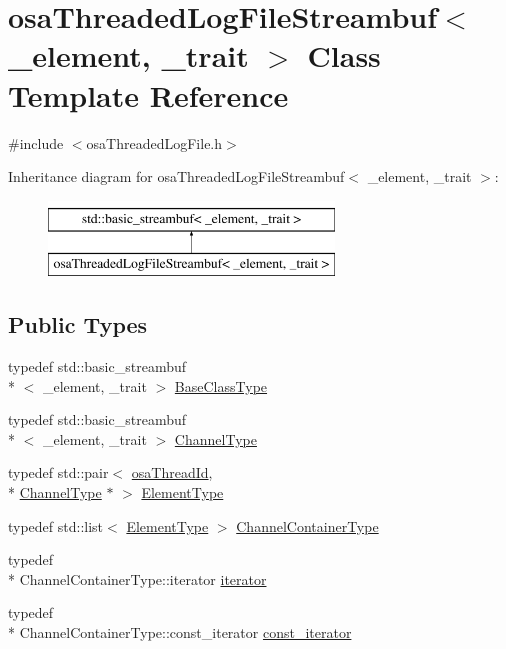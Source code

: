 \hypertarget{classosa_threaded_log_file_streambuf}{\section{osa\-Threaded\-Log\-File\-Streambuf$<$ \-\_\-element, \-\_\-trait $>$ Class Template Reference}
\label{classosa_threaded_log_file_streambuf}
}


{\ttfamily \#include $<$osa\-Threaded\-Log\-File.\-h$>$}

Inheritance diagram for osa\-Threaded\-Log\-File\-Streambuf$<$ \-\_\-element, \-\_\-trait $>$\-:\begin{figure}[H]
\begin{center}
\leavevmode
\includegraphics[height=2.000000cm]{dc/d13/classosa_threaded_log_file_streambuf}
\end{center}
\end{figure}
\subsection*{Public Types}
\begin{DoxyCompactItemize}
\item 
typedef std\-::basic\-\_\-streambuf\\*
$<$ \-\_\-element, \-\_\-trait $>$ \hyperlink{classosa_threaded_log_file_streambuf_a918db063483813434ed1d8f81c3fb205}{Base\-Class\-Type}
\item 
typedef std\-::basic\-\_\-streambuf\\*
$<$ \-\_\-element, \-\_\-trait $>$ \hyperlink{classosa_threaded_log_file_streambuf_a216ca33908152519430e5456e828805f}{Channel\-Type}
\item 
typedef std\-::pair$<$ \hyperlink{classosa_thread_id}{osa\-Thread\-Id}, \\*
\hyperlink{classosa_threaded_log_file_streambuf_a216ca33908152519430e5456e828805f}{Channel\-Type} $\ast$ $>$ \hyperlink{classosa_threaded_log_file_streambuf_afe93c480e5a97ccc96aa3027a8c15ed5}{Element\-Type}
\item 
typedef std\-::list$<$ \hyperlink{classosa_threaded_log_file_streambuf_afe93c480e5a97ccc96aa3027a8c15ed5}{Element\-Type} $>$ \hyperlink{classosa_threaded_log_file_streambuf_aa02aa00f9d3dbd620e15914d5ee83fb5}{Channel\-Container\-Type}
\item 
typedef \\*
Channel\-Container\-Type\-::iterator \hyperlink{classosa_threaded_log_file_streambuf_a2f40fd9fa3cc49d0c1adfda883c35fa0}{iterator}
\item 
typedef \\*
Channel\-Container\-Type\-::const\-\_\-iterator \hyperlink{classosa_threaded_log_file_streambuf_ae7f904ba3ba23106eb4821db7db66a26}{const\-\_\-iterator}
\end{DoxyCompactItemize}
